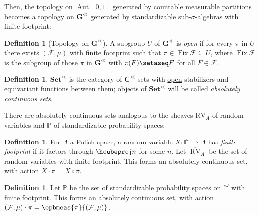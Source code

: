 \documentclass[
  sigconf,
  screen, ]{acmart}
\theoremstyle{definition}
\newtheorem{definition}[theorem]{Definition}
\newcommand\Aut{\operatorname{Aut}}
\newcommand\calF{\mathcal F}
\newcommand\nref[2]{\hyperref[#1]{#2}} \newcommand\checkhigh{{\huge{\color{red}\textbf{TODO: check}}}}
\newcommand\texhcube{{{{\mathbb I}^\omega}}}
\newcommand\hcube{{\nref{def:hcube}{\texhcube}}}
\newcommand\texagoodname{absolutely continuous set}
\newcommand\agoodname{\texagoodname}
\newcommand\aagoodname{an \texagoodname}
\newcommand\agoodnamecat{\mathbf{Set}^\ll}
\newcommand\dauti{\nref{def:dauti}{\Aut[0,1]}}
\newcommand\RV{\mathrm{RV}}
\newcommand\RVshf{{\nref{lem:rv-mble-sheaf}{\RV}}}
\newcommand\texpspcs{\mathbb P}
\newcommand\pspcs{{\nref{def:mble-pspcs}{\texpspcs}}}
\newcommand\texauti{\mathbf{G}^{\ll}}
\newcommand\auti{{\nref{def:auti}{\texauti}}}
\newcommand\texgpspcs{\overline{\mathbb P}}
\newcommand\gpspcs{{\nref{def:gpspcs}{\texgpspcs}}}
\newcommand\texgRV{\overline{\operatorname{RV}}}
\newcommand\gRV{{\nref{def:gRV}{\texgRV}}}
\newcommand\cgsets{{\nref{def:cgsets}{\agoodnamecat}}}
\begin{document}
Then, the topology on $\dauti$ generated by countable measurable partitions
becomes a topology on $\auti$ generated by standardizable sub-$\sigma$-algebras with finite footprint:

\newcommand\autiFix{\operatorname{\nref{def:autiFix}{Fix}}}
\begin{definition}[Topology on $\auti$] \label{def:auti-open} \label{def:autiFix}
  A subgroup $U$ of $\auti$ is
  \emph{open} if for every $\pi$ in $U$
  there exists $(\calF,\mu)$ with finite footprint
  such that $\pi\in\autiFix\calF\subseteq U$,
  where $\autiFix \calF$ is the subgroup of
  those $\pi$ in $\auti$ with $\pi(F) \setaseq F$ for all $F\in\calF$.
\end{definition}

\begin{definition} \label{def:pnom} \label{def:cgsets}
  $\cgsets$ is the category of
  $\auti$-sets with \nref{def:auti-open}{open} stabilizers
  and equivariant functions between them;
  objects of $\cgsets$ will be called \emph{\agoodname{s}}.
\end{definition}

There are \agoodname{s}
analogous to the sheaves $\RVshf_A$ of random variables
and $\pspcs$ of standardizable probability spaces:

\begin{definition} \label{def:gRV}
  For $A$ a Polish space,
  a random variable $X : \hcube\to A$
  has \emph{finite footprint}
  if it factors through $\hcubeproj n$ for some $n$.
  Let $\gRV_A$ be the set of random variables with finite footprint.
  This forms \aagoodname{}, with action $X\cdot\pi = X\circ \pi$.
\end{definition}

\begin{definition} \label{def:gpspcs}
  Let $\gpspcs$ be the set of standardizable probability spaces on $\hcube$
  with finite footprint. This forms \aagoodname{},
  with action $(\calF,\mu)\cdot\pi = \epbmeas{\pi}{(\calF,\mu)}$.
\end{definition}
\end{document}
